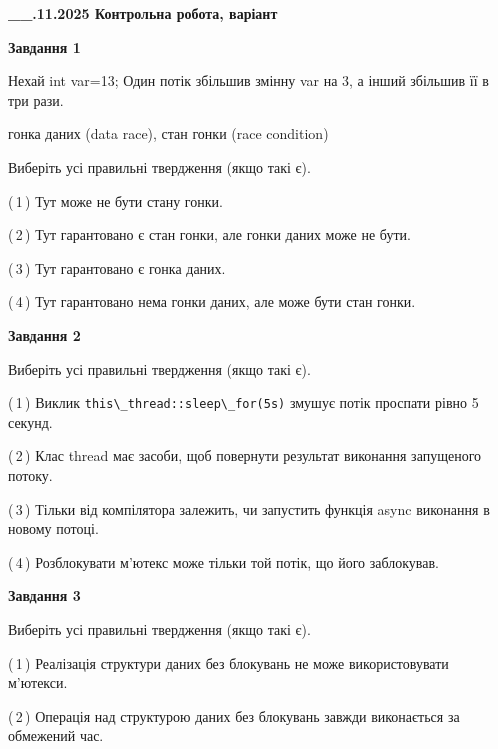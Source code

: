 \documentclass[12pt, ukrainian]{article}
\def\code#1{\Verb!#1!}
\begin{document}
\begin {large}

\textbf{\_\_.11.2025 Контрольна робота, варіант  }\par


{

\begin{center}
\textbf{Завдання 1}
\end{center}
Нехай int var=13; Один потік збільшив змінну var на 3, а інший збільшив її в три рази.

гонка даних (data race), стан гонки (race condition)

Виберіть усі правильні твердження (якщо такі є).\par
\vspace{2mm}
(\,1\,) Тут може не бути стану гонки.%

(\,2\,) Тут гарантовано є стан гонки, але гонки даних може не бути.%

(\,3\,) Тут гарантовано є гонка даних.%

(\,4\,) Тут гарантовано нема гонки даних, але може бути стан гонки.%



\begin{center}
\textbf{Завдання 2}
\end{center}
Виберіть усі правильні твердження (якщо такі є).\par
\vspace{2mm}

(\,1\,) Виклик \code{this\_thread::sleep\_for(5s)} змушує потік проспати рівно 5 секунд.%

(\,2\,) Клас thread має засоби, щоб повернути результат виконання запущеного потоку.%

(\,3\,) Тільки від компілятора залежить, чи запустить функція async виконання в новому потоці.%

(\,4\,) Розблокувати м’ютекс може тільки той потік, що його заблокував.%



\begin{center}
\textbf{Завдання 3}
\end{center}
Виберіть усі правильні твердження (якщо такі є).\par
\vspace{2mm}

(\,1\,) Реалізація структури даних без блокувань не може використовувати м’ютекси.%

(\,2\,) Операція над структурою даних без блокувань завжди виконається за обмежений час.%

}
\end{large}
\end{document}

